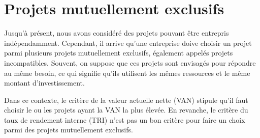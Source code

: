 \documentclass[a4paper, 12pt]{report}
\begin{document}
\section{Projets mutuellement exclusifs}

Jusqu'à présent, nous avons considéré des projets pouvant être entrepris indépendamment. Cependant, il arrive qu'une entreprise doive choisir un projet parmi plusieurs projets mutuellement exclusifs, également appelés projets incompatibles. Souvent, on suppose que ces projets sont envisagés pour répondre au même besoin, ce qui signifie qu'ils utilisent les mêmes ressources et le même montant d’investissement.

Dans ce contexte, le critère de la valeur actuelle nette (VAN) stipule qu'il faut choisir le ou les projets ayant la VAN la plus élevée. En revanche, le critère du taux de rendement interne (TRI) n'est pas un bon critère pour faire un choix parmi des projets mutuellement exclusifs.
\end{document}
